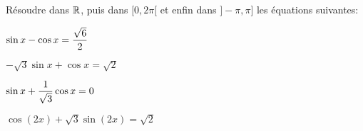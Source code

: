 \documentclass[a4paper, 11pt]{article}
\begin{document}
\begin{exercice}  \;
R\'esoudre dans $\mathbb{R}$, puis dans $\lbrack 0,2\pi\lbrack$ et enfin dans $\rbrack -\pi,\pi\rbrack$ les \'equations suivantes:
\begin{enumerate}
\noindent \begin{minipage}[t]{0.45\textwidth}
\item $\sin{x}-\cos{x}=\displaystyle\frac{\sqrt{6}}{2}$
\item $-\sqrt{3}\sin{x}+\cos{x}=\sqrt{2}$
\end{minipage}
\begin{minipage}[t]{0.45\textwidth}
\item $\sin{x}+\displaystyle\frac{1}{\sqrt{3}}\cos{x}=0$
\item $\cos{(2x)}+\sqrt{3}\sin{(2x)}=\sqrt{2}$
\end{minipage}
\end{enumerate}
\end{exercice}
\end{document}
